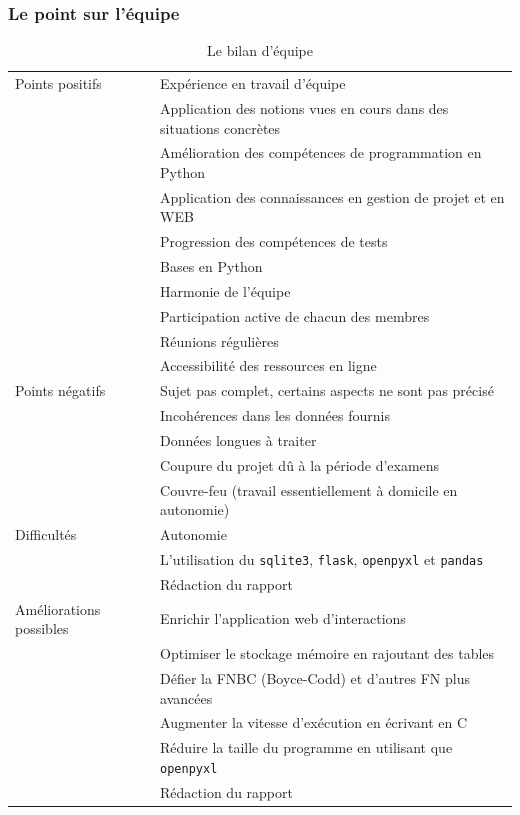 \documentclass[12pt]{article}
\begin{document}
        \subsubsection*{Le point sur l'équipe}
        \begin{table}[!h]
            \centering
            \begin{tabular}{|l|l|}
                \hline
                Points positifs & Expérience en travail d'équipe \\
                 & Application des notions vues en cours dans des situations concrètes \\
                 & Amélioration des compétences de programmation en \textsf{Python} \\
                 & Application des connaissances en gestion de projet et en WEB \\
                 & Progression des compétences de tests \\
                 & Bases en \textsf{Python} \\
                 & Harmonie de l'équipe \\
                 & Participation active de chacun des membres \\
                 & Réunions régulières \\
                 & Accessibilité des ressources en ligne \\
                \hline
                Points négatifs & Sujet pas complet, certains aspects ne sont pas précisé \\
                 & Incohérences dans les données fournis \\
                 & Données longues à traiter \\
                 & Coupure du projet dû à la période d'examens \\ 
                 & Couvre-feu (travail essentiellement à domicile en autonomie) \\
                \hline
                Difficultés & Autonomie \\
                 & L'utilisation du \texttt{sqlite3}, \texttt{flask}, \texttt{openpyxl} et \texttt{pandas} \\ 
                 & Rédaction du rapport \\
                \hline
                Améliorations possibles & Enrichir l'application web d'interactions \\
                 & Optimiser le stockage mémoire en rajoutant des tables \\
                 & Défier la FNBC (Boyce-Codd) et d'autres FN plus avancées \\
                 & Augmenter la vitesse d'exécution en écrivant en C \\
                 & Réduire la taille du programme en utilisant que \texttt{openpyxl} \\
                 & Rédaction du rapport \\
                \hline
            \end{tabular}
            \caption{Le bilan d'équipe}
            \label{tab:my_label}
        \end{table}
\end{document}
